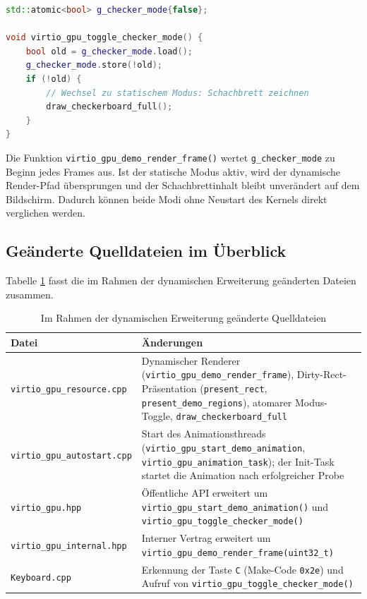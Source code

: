\begin{lstlisting}[language=C++, basicstyle=\small\ttfamily, frame=single, caption=Moduswechsel-Logik in \texttt{virtio\_gpu\_resource.cpp}]
std::atomic<bool> g_checker_mode{false};

void virtio_gpu_toggle_checker_mode() {
    bool old = g_checker_mode.load();
    g_checker_mode.store(!old);
    if (!old) {
        // Wechsel zu statischem Modus: Schachbrett zeichnen
        draw_checkerboard_full();
    }
}
\end{lstlisting}

Die Funktion \texttt{virtio\_gpu\_demo\_render\_frame()} wertet
\texttt{g\_checker\_mode} zu Beginn jedes Frames aus. Ist der statische Modus
aktiv, wird der dynamische Render-Pfad übersprungen und der Schachbrettinhalt
bleibt unverändert auf dem Bildschirm. Dadurch können beide Modi ohne Neustart
des Kernels direkt verglichen werden.

\subsection{Geänderte Quelldateien im Überblick}
Tabelle \ref{tab:changed_files} fasst die im Rahmen der dynamischen Erweiterung
geänderten Dateien zusammen.

\begin{table}[ht]
\centering
\caption{Im Rahmen der dynamischen Erweiterung geänderte Quelldateien}
\label{tab:changed_files}
\begin{tabular}{l p{8.5cm}}
\toprule
\textbf{Datei} & \textbf{Änderungen} \\ \midrule
\texttt{virtio\_gpu\_resource.cpp} & Dynamischer Renderer (\texttt{virtio\_gpu\_demo\_render\_frame}), Dirty-Rect-Präsentation (\texttt{present\_rect}, \texttt{present\_demo\_regions}), atomarer Modus-Toggle, \texttt{draw\_checkerboard\_full} \\
\texttt{virtio\_gpu\_autostart.cpp} & Start des Animationsthreads (\texttt{virtio\_gpu\_start\_demo\_animation}, \texttt{virtio\_gpu\_animation\_task}); der Init-Task startet die Animation nach erfolgreicher Probe \\
\texttt{virtio\_gpu.hpp} & Öffentliche API erweitert um \texttt{virtio\_gpu\_start\_demo\_animation()} und \texttt{virtio\_gpu\_toggle\_checker\_mode()} \\
\texttt{virtio\_gpu\_internal.hpp} & Interner Vertrag erweitert um \texttt{virtio\_gpu\_demo\_render\_frame(uint32\_t)} \\
\texttt{Keyboard.cpp} & Erkennung der Taste \texttt{C} (Make-Code \texttt{0x2e}) und Aufruf von \texttt{virtio\_gpu\_toggle\_checker\_mode()} \\ \bottomrule
\end{tabular}
\end{table}

